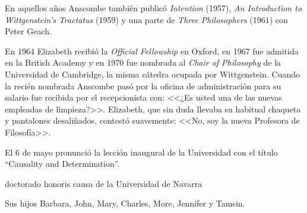 En aquellos años Anscombe también publicó \emph{Intention} (1957), \emph{An
  Introduction to Wittgenstein's Tractatus} (1959) y una parte de \emph{Three
  Philosophers} (1961) con Peter
Geach.\autocite[cfr.~][p.~39]{teichman2002fellows}

En 1964 Elizabeth recibió la \emph{Official Fellowship} en Oxford, en 1967 fue
admitida en la British Academy y en 1970 fue nombrada al \emph{Chair of
  Philosophy} de la Universidad de Cambridge, la misma cátedra ocupada por
Wittgenstein. Cuando la recién nombrada Anscombe pasó por la oficina de
administración para su salario fue recibida por el recepcionista con: <<¿Es
usted una de las nuevas empleadas de limpieza?>>. Elizabeth, que sin duda
llevaba su habitual chaqueta y pantalones desaliñados, contestó suavemente:
<<No, soy la nueva Profesora de
Filosofía>>.\autocite[cfr.~][p.~37]{teichman2002fellows}

El 6 de mayo pronunció la lección inaugural de la Universidad con el título
``Causality and Determination''.

doctorado honoris causa de la Universidad de Navarra

Sus hijos Barbara, John, Mary, Charles, More, Jennifer y Tamsin.
